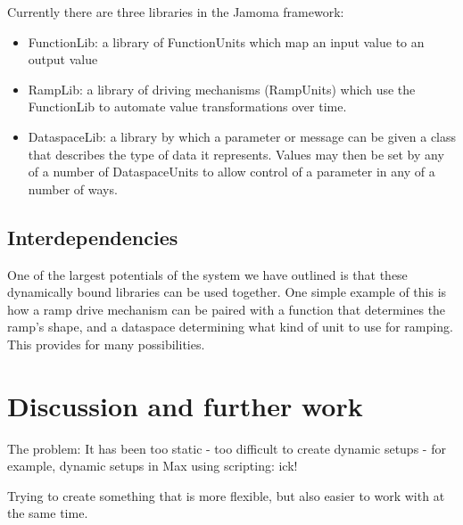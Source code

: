 \documentclass{article}
\begin{document}
Currently there are three libraries in the Jamoma framework:
\begin{itemize}
	\item FunctionLib: a library of FunctionUnits which map an input value to an output value
	\item RampLib: a library of driving mechanisms (RampUnits) which use the FunctionLib to automate value transformations over time.
	\item DataspaceLib: a library by which a parameter or message can be given a class that describes the type of data it represents.  Values may then be set by any of a number of DataspaceUnits to allow control of a parameter in any of a number of ways.
\end{itemize}







\subsection{Interdependencies}\label{sec:interdependencies}

One of the largest potentials of the system we have outlined is that these dynamically bound libraries can be used together. One simple example of this is how a ramp drive mechanism can be paired with a function that determines the ramp's shape, and a dataspace determining what kind of unit to use for ramping.  This provides for many possibilities.




\section{Discussion and further work} %
\label{sec:discussion_and_further_work}

The problem: 
It has been too static
    - too difficult to create dynamic setups
    - for example, dynamic setups in Max using scripting: ick!

Trying to create something that is more flexible, but also easier to work with at the same time.
\end{document}
